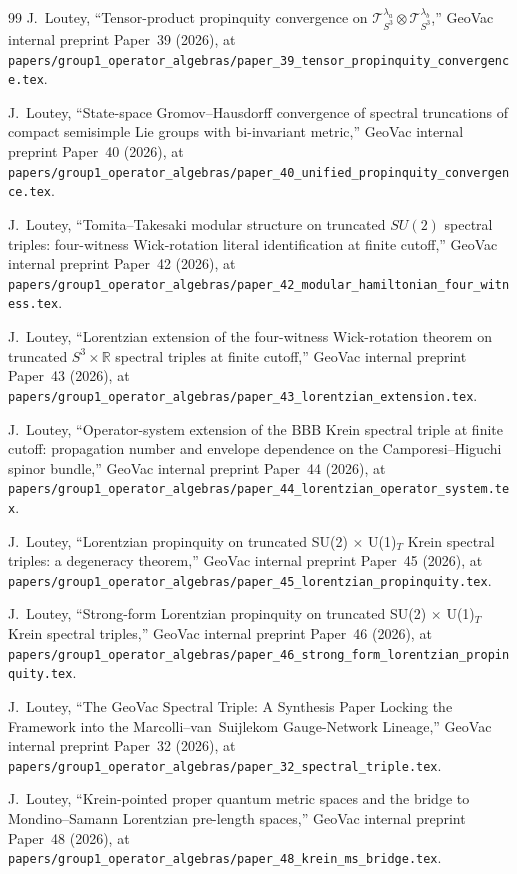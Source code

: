 \documentclass[11pt,a4paper]{article}
\theoremstyle{plain}
\theoremstyle{definition}
\newcommand{\Tcal}{\mathcal{T}}
\begin{document}
\begin{thebibliography}{99}
J.~Loutey, ``Tensor-product propinquity convergence on
$\Tcal_{S^{3}}^{\lambda_{a}}\otimes\Tcal_{S^{3}}^{\lambda_{b}}$,''
GeoVac internal preprint Paper~39 (2026), at
\texttt{papers/group1\_operator\_algebras/paper\_39\_tensor\_propinquity\_convergence.tex}.

J.~Loutey, ``State-space Gromov--Hausdorff convergence of spectral
truncations of compact semisimple Lie groups with bi-invariant metric,'' GeoVac
internal preprint Paper~40 (2026), at
\texttt{papers/group1\_operator\_algebras/paper\_40\_unified\_propinquity\_convergence.tex}.

J.~Loutey, ``Tomita--Takesaki modular structure on truncated $SU(2)$
spectral triples: four-witness Wick-rotation literal identification
at finite cutoff,'' GeoVac internal preprint Paper~42 (2026), at
\texttt{papers/group1\_operator\_algebras/paper\_42\_modular\_hamiltonian\_four\_witness.tex}.

J.~Loutey, ``Lorentzian extension of the four-witness Wick-rotation
theorem on truncated $S^3 \times \mathbb{R}$ spectral triples at finite
cutoff,'' GeoVac internal preprint
Paper~43 (2026), at
\texttt{papers/group1\_operator\_algebras/paper\_43\_lorentzian\_extension.tex}.

J.~Loutey, ``Operator-system extension of the BBB Krein spectral
triple at finite cutoff: propagation number and envelope dependence
on the Camporesi--Higuchi spinor bundle,'' GeoVac internal preprint Paper~44 (2026),
at
\texttt{papers/group1\_operator\_algebras/paper\_44\_lorentzian\_operator\_system.tex}.

J.~Loutey, ``Lorentzian propinquity on truncated SU(2)
$\times$ U(1)$_{T}$ Krein spectral triples: a degeneracy theorem,'' GeoVac internal
preprint Paper~45 (2026), at
\texttt{papers/group1\_operator\_algebras/paper\_45\_lorentzian\_propinquity.tex}.

J.~Loutey, ``Strong-form Lorentzian propinquity on
truncated SU(2) $\times$ U(1)$_{T}$ Krein spectral triples,''
GeoVac internal preprint Paper~46 (2026), at
\texttt{papers/group1\_operator\_algebras/paper\_46\_strong\_form\_lorentzian\_propinquity.tex}.

J.~Loutey, ``The GeoVac Spectral Triple: A Synthesis Paper Locking the
Framework into the Marcolli--van~Suijlekom Gauge-Network Lineage,''
GeoVac internal preprint Paper~32 (2026), at
\texttt{papers/group1\_operator\_algebras/paper\_32\_spectral\_triple.tex}.

J.~Loutey, ``Krein-pointed proper quantum metric spaces and the bridge
to Mondino--Samann Lorentzian pre-length spaces,''
GeoVac internal preprint Paper~48 (2026), at
\texttt{papers/group1\_operator\_algebras/paper\_48\_krein\_ms\_bridge.tex}.

\end{thebibliography}
\end{document}
